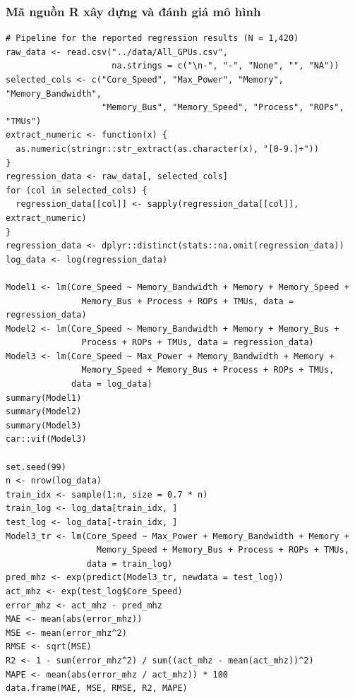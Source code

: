 \subsubsection{Mã nguồn R xây dựng và đánh giá mô hình}

\begin{lstlisting}
# Pipeline for the reported regression results (N = 1,420)
raw_data <- read.csv("../data/All_GPUs.csv",
                     na.strings = c("\n-", "-", "None", "", "NA"))
selected_cols <- c("Core_Speed", "Max_Power", "Memory", "Memory_Bandwidth",
                   "Memory_Bus", "Memory_Speed", "Process", "ROPs", "TMUs")
extract_numeric <- function(x) {
  as.numeric(stringr::str_extract(as.character(x), "[0-9.]+"))
}
regression_data <- raw_data[, selected_cols]
for (col in selected_cols) {
  regression_data[[col]] <- sapply(regression_data[[col]], extract_numeric)
}
regression_data <- dplyr::distinct(stats::na.omit(regression_data))
log_data <- log(regression_data)

Model1 <- lm(Core_Speed ~ Memory_Bandwidth + Memory + Memory_Speed +
               Memory_Bus + Process + ROPs + TMUs, data = regression_data)
Model2 <- lm(Core_Speed ~ Memory_Bandwidth + Memory + Memory_Bus +
               Process + ROPs + TMUs, data = regression_data)
Model3 <- lm(Core_Speed ~ Max_Power + Memory_Bandwidth + Memory +
               Memory_Speed + Memory_Bus + Process + ROPs + TMUs,
             data = log_data)
summary(Model1)
summary(Model2)
summary(Model3)
car::vif(Model3)

set.seed(99)
n <- nrow(log_data)
train_idx <- sample(1:n, size = 0.7 * n)
train_log <- log_data[train_idx, ]
test_log <- log_data[-train_idx, ]
Model3_tr <- lm(Core_Speed ~ Max_Power + Memory_Bandwidth + Memory +
                  Memory_Speed + Memory_Bus + Process + ROPs + TMUs,
                data = train_log)
pred_mhz <- exp(predict(Model3_tr, newdata = test_log))
act_mhz <- exp(test_log$Core_Speed)
error_mhz <- act_mhz - pred_mhz
MAE <- mean(abs(error_mhz))
MSE <- mean(error_mhz^2)
RMSE <- sqrt(MSE)
R2 <- 1 - sum(error_mhz^2) / sum((act_mhz - mean(act_mhz))^2)
MAPE <- mean(abs(error_mhz / act_mhz)) * 100
data.frame(MAE, MSE, RMSE, R2, MAPE)
\end{lstlisting}
